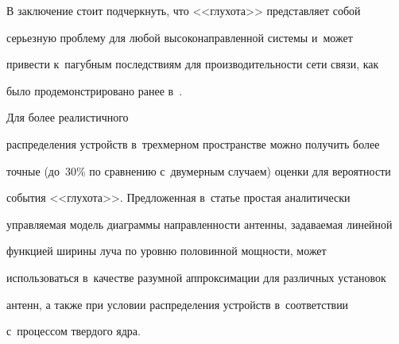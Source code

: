   В заключение стоит подчеркнуть, что <<глухота>> представляет собой 


серь\-ез\-ную проблему для любой высоконаправленной системы и~может 


привести к~пагубным последствиям для производительности сети связи, как 


было продемонстрировано ранее в~\cite{5-chu}. 


Для более реалистичного 


распределения устройств в~трехмерном пространстве можно получить более 


точные (до~30\% по сравнению с~двумерным случаем) оценки для вероятности 


события <<глухота>>. Предложенная в~статье простая аналитически 


управляемая модель диаграммы на\-прав\-лен\-ности антенны, задаваемая линейной 


функцией ширины луча по уровню половинной мощ\-ности, может 


использоваться в~качестве разумной аппроксимации для различных установок 


антенн, а также при условии распределения устройств в~соответствии 


с~процессом твердого ядра.


  


